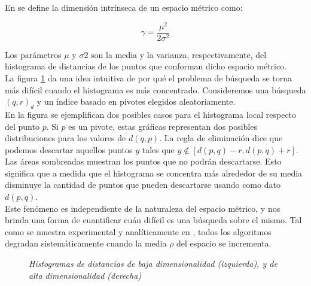 \noindent En \cite{oursurvey} se define la dimensi\'on intr\'inseca de un espacio m\'etrico como:

\[
\gamma = \frac{\mu^2}{2\sigma^2}
\]

Los par\'ametros $\mu$ y $\sigma 2$ son la media y la varianza, respectivamente, del histograma de distancias de los puntos que conforman dicho espacio m\'etrico.\\



La figura \ref{dim1} da una idea intuitiva de por qu\'e el problema
de b\'usqueda se torna m\'as dif\'icil cuando el histograma es m\'as
concentrado. Consideremos una b\'usqueda $(q,r)_{d}$ y un \'indice
basado en pivotes elegidos aleatoriamente.\\
En la figura se ejemplifican dos posibles casos para el histograma
local respecto del punto $p$. Si $p$ es un pivote, estas gr\'aficas
representan dos posibles distribuciones para los valores de
$d(q,p)$. La regla de eliminaci\'on dice que podemos descartar aquellos
puntos $y$ tales que  $y \notin [d(p,q)-r, d(p,q) + r]$. Las \'areas sombreadas
muestran  los puntos que no podr\'an descartarse. Esto significa que a medida
que el histograma se concentra m\'as alrededor de su media disminuye la
cantidad de puntos que pueden descartarse usando como dato $d(p,q)$.\\

Este fen\'omeno es independiente de la naturaleza del espacio
m\'etrico,  y nos brinda una forma de cuantificar cu\'an dif\'icil es una
b\'usqueda sobre el mismo. Tal como se muestra experimental y anal\'iticamente
en \cite{oursurvey}, todos los algoritmos degradan  sistem\'aticamente
cuando la media $\rho$ del espacio se incrementa.

\begin{figure}[tb]
\centerline{%
  }
  \caption [Histogramas de distancias de baja y
             alta dimensionalidad]
    { \textsl{\footnotesize Histogramas de distancias de baja dimensionalidad
                (izquierda), y  de alta dimensionalidad (derecha)}}
\label{dim1}
\end{figure}

